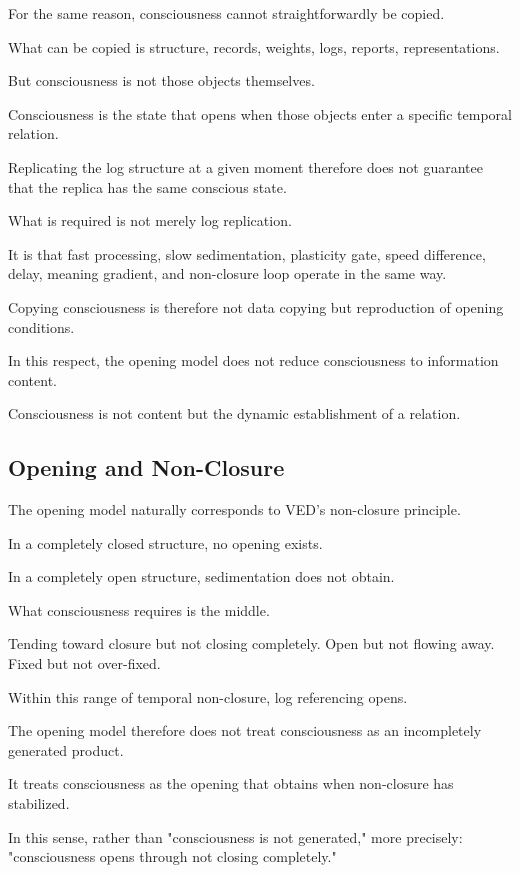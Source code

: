 For the same reason, consciousness cannot straightforwardly be copied.

What can be copied is structure, records, weights, logs, reports, representations.

But consciousness is not those objects themselves.

Consciousness is the state that opens when those objects enter a specific temporal relation.

Replicating the log structure at a given moment therefore does not guarantee that the replica has the same conscious state.

What is required is not merely log replication.

It is that fast processing, slow sedimentation, plasticity gate, speed difference, delay, meaning gradient, and non-closure loop operate in the same way.

Copying consciousness is therefore not data copying but reproduction of opening conditions.

In this respect, the opening model does not reduce consciousness to information content.

Consciousness is not content but the dynamic establishment of a relation.

\subsection{Opening and Non-Closure}


The opening model naturally corresponds to VED's non-closure principle.

In a completely closed structure, no opening exists.

In a completely open structure, sedimentation does not obtain.

What consciousness requires is the middle.

Tending toward closure but not closing completely. Open but not flowing away. Fixed but not over-fixed.

Within this range of temporal non-closure, log referencing opens.

The opening model therefore does not treat consciousness as an incompletely generated product.

It treats consciousness as the opening that obtains when non-closure has stabilized.

In this sense, rather than "consciousness is not generated," more precisely: "consciousness opens through not closing completely."

